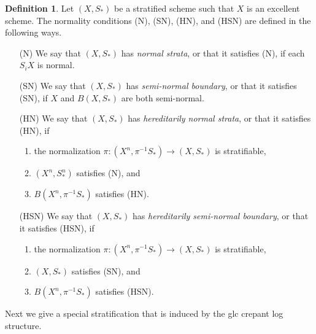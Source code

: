 \documentclass[11pt]{amsart}
\numberwithin{equation}{section}
\theoremstyle{definition}
\newtheorem{defn}[thm]{Definition}
\theoremstyle{definition}
\theoremstyle{definition}
\begin{document}
\begin{defn}
  Let $(X,S_*)$ be a stratified scheme such that $X$ is an excellent
  scheme. The normality conditions (N), (SN), (HN), and (HSN)  are
  defined in the following ways.
  \begin{enumerate}
    \item[(N)] We say that $(X,S_*)$ has {\it normal strata}, or that
      it satisfies (N), if each $S_iX$ is normal.
    \item[(SN)] We say that $(X,S_*)$ has {\it semi-normal boundary},
      or that it satisfies (SN), if $X$ and $B(X,S_*)$ are both semi-normal.
    \item[(HN)] We say that $(X,S_*)$ has {\it hereditarily normal
      strata}, or that it satisfies (HN), if
      \begin{enumerate}
        \item the normalization $\pi: (X^n,\pi^{-1}S_*)\to (X,S_*)$
          is stratifiable,
        \item $(X^n,S_*^n)$ satisfies (N), and
        \item $B(X^n,\pi^{-1}S_*)$ satisfies (HN).
      \end{enumerate}
    \item[(HSN)] We say that $(X,S_*)$ has {\it hereditarily
      semi-normal boundary}, or that it
      satisfies (HSN), if
      \begin{enumerate}
        \item the normalization $\pi: (X^n,\pi^{-1}S_*)\to (X,S_*)$
          is stratifiable,
        \item $(X,S_*)$ satisfies (SN), and
        \item $B(X^n,\pi^{-1}S_*)$ satisfies (HSN).
      \end{enumerate}
  \end{enumerate}
\end{defn}

Next we give a special stratification that is induced by the glc
crepant log structure.
\end{document}
